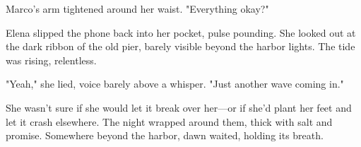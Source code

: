 Marco's arm tightened around her waist. "Everything okay?"

Elena slipped the phone back into her pocket, pulse pounding. She looked out at the dark ribbon of the old pier, barely visible beyond the harbor lights. The tide was rising, relentless.

"Yeah," she lied, voice barely above a whisper. "Just another wave coming in."

She wasn't sure if she would let it break over her—or if she'd plant her feet and let it crash elsewhere. The night wrapped around them, thick with salt and promise. Somewhere beyond the harbor, dawn waited, holding its breath.

